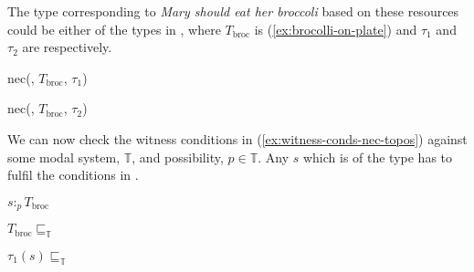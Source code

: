 The type corresponding to \textit{Mary should eat her broccoli} based
on these resources could be either of the types in \nexteg{}, where
$T_{\mathrm{broc}}$ is (\ref{ex:brocolli-on-plate}) and $\tau_1$ and
  $\tau_2$ are  respectively.
\begin{ex} 
\begin{subex} 
 
\item nec(, 
  $T_{\mathrm{broc}}$, $\tau_1$)
 
\item nec(, 
  $T_{\mathrm{broc}}$, $\tau_2$) 
 
\end{subex} 
\label{ex:Mary-should-eat-her-brocolli-types}   
\end{ex} 
We can now check the witness conditions in
(\ref{ex:witness-conds-nec-topos}) against some modal system,
$\mathbb{T}$, and possibility, $p\in\mathbb{T}$.  Any $s$ which is of the type
 has to fulfil the conditions in \nexteg{}.
\begin{ex} 
\begin{subex} 
 
\item $s:_pT_{\mathrm{broc}}$ 
 
\item $T_{\mathrm{broc}}\sqsubseteq_{\mathbb{T}}$ 

\item  $\tau_1(s)\sqsubseteq_{\mathbb{T}}$  
 
\end{subex} 
\label{ex:Mary-eat-her-brocolli-conditions}   
\end{ex} 
